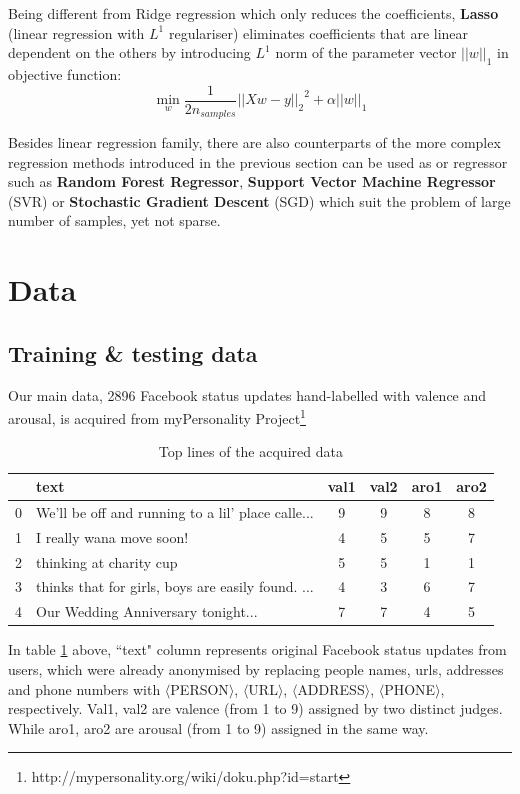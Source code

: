 \documentclass[12pt]{article}
\begin{document}
Being different from Ridge regression which only reduces the coefficients, \textbf{Lasso} (linear regression with $L^1$ regulariser) eliminates coefficients that are linear dependent on the others by introducing $L^1$ norm of the parameter vector $||w||_1$ in objective function:
\[\min_w\frac{1}{2n_{samples}}{||Xw-y||_2}^2+\alpha||w||_1\]

Besides linear regression family, there are also counterparts of the more complex regression methods introduced in the previous section can be used as or regressor such as \textbf{Random Forest Regressor}, \textbf{Support Vector Machine Regressor} (SVR) or \textbf{Stochastic Gradient Descent} (SGD) which suit the problem of large number of samples, yet not sparse.

\section{Data} \label{data}

\subsection{Training \& testing data} \label{main_data}

Our main data, 2896 Facebook status updates hand-labelled with valence and arousal, is acquired from myPersonality Project\footnote{http://mypersonality.org/wiki/doku.php?id=start}
\begin{table}[H]
	\centering
	\begin{tabular}{| c | l | c | c | c | c |}
		\hline
		& \textbf{text} & \textbf{val1} & \textbf{val2} & \textbf{aro1} & \textbf{aro2}\\
		\hline
		0 & We'll be off and running to a lil' place calle... & 9 & 9 & 8 & 8\\
		\hline
		1 & I really wana move soon! & 4 & 5 & 5 & 7\\
		\hline
		2 & thinking at charity cup & 5 & 5 & 1 & 1\\
		\hline
		3 & thinks that for girls, boys are easily found. ... & 4 & 3 & 6 & 7\\
		\hline
		4 & Our Wedding Anniversary tonight... & 7 & 7 & 4 & 5\\
		\hline
	\end{tabular}
	\caption{Top lines of the acquired data}
	\label{tb:data_first_lines}
\end{table}

In table \ref{tb:data_first_lines} above, ``text" column represents original Facebook status updates from users\cite{preotiuc2016modelling}, which were already anonymised by replacing people names, urls, addresses and phone numbers with $\langle$PERSON$\rangle$, $\langle$URL$\rangle$, $\langle$ADDRESS$\rangle$, $\langle$PHONE$\rangle$, respectively. Val1, val2 are valence (from 1 to 9) assigned by two distinct judges. While aro1, aro2 are arousal (from 1 to 9) assigned in the same way.
\end{document}
